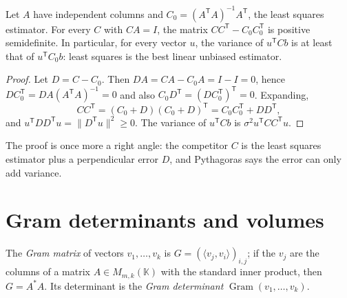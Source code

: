 \begin{theorem}\label{thm:gaussmarkov}
Let $A$ have independent columns and $C_0=(A^{\mathsf T}A)^{-1}A^{\mathsf T}$, the least squares estimator. For every
$C$ with $CA=I$, the matrix $CC^{\mathsf T}-C_0C_0^{\mathsf T}$ is positive semidefinite. In particular, for every
vector $u$, the variance of $u^{\mathsf T}Cb$ is at least that of $u^{\mathsf T}C_0b$: least squares is the best linear
unbiased estimator.
\end{theorem}
\begin{proof}
Let $D=C-C_0$. Then $DA=CA-C_0A=I-I=0$, hence $DC_0^{\mathsf T}=DA(A^{\mathsf T}A)^{-1}=0$ and also $C_0D^{\mathsf
T}=(DC_0^{\mathsf T})^{\mathsf T}=0$. Expanding,
\[
CC^{\mathsf T}=(C_0+D)(C_0+D)^{\mathsf T}=C_0C_0^{\mathsf T}+DD^{\mathsf T},
\]
and $u^{\mathsf T}DD^{\mathsf T}u=\|D^{\mathsf T}u\|^2\ge0$. The variance of $u^{\mathsf T}Cb$ is
$\sigma^2u^{\mathsf T}CC^{\mathsf T}u$.
\end{proof}

The proof is once more a right angle: the competitor $C$ is the least squares estimator plus a perpendicular error
$D$, and Pythagoras says the error can only add variance.

\section{Gram determinants and volumes}

The \emph{Gram matrix} of vectors $v_1,\dots,v_k$ is $G=(\langle v_j,v_i\rangle)_{i,j}$; if the $v_j$ are the columns of
a matrix $A\in M_{m,k}(\mathbb K)$ with the standard inner product, then $G=A^*A$. Its determinant is the \emph{Gram
determinant} $\operatorname{Gram}(v_1,\dots,v_k)$.

